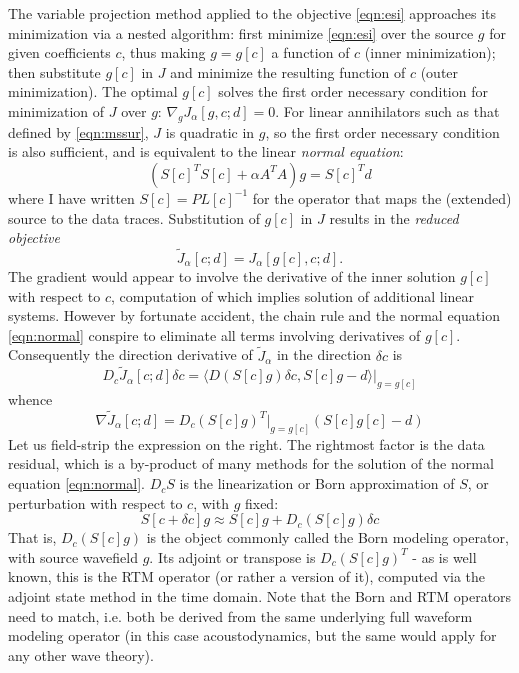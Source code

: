 The variable projection method \cite[]{GolubPereyra:03} applied to the objective \ref{eqn:esi} approaches its minimization via a nested algorithm: first minimize \ref{eqn:esi} over the source $g$ for given coefficients $c$, thus making $g = g[c]$ a function of $c$ (inner minimization); then substitute $g[c]$ in $J$ and minimize the resulting function of $c$ (outer minimization). The optimal $g[c]$ solves the first order necessary condition for minimization of $J$ over $g$: $\nabla_g J_{\alpha}[g,c;d] = 0$. For linear annihilators such as that defined by \ref{eqn:mssur}, $J$ is quadratic in $g$, so the first order necessary condition is also sufficient, and is equivalent to the linear {\em normal equation}:
\begin{equation}
\label{eqn:normal}
(S[c]^TS[c] + \alpha A^TA) g = S[c]^T d
\end{equation}
where I have written $S[c]=PL[c]^{-1}$ for the operator that maps the (extended) source to the data traces. Substitution of $g[c]$ in $J$ results in the {\em reduced objective}
\begin{equation}
\label{eqn:jred}
\tilde{J}_{\alpha}[c;d] = J_{\alpha}[g[c],c;d].
\end{equation}
The gradient would appear to involve the derivative of the inner solution $g[c]$ with respect to $c$, computation of which implies solution of additional linear systems. However by fortunate accident, the chain rule and the normal equation \ref{eqn:normal}
conspire to eliminate all terms involving derivatives of $g[c]$. Consequently the direction derivative of $\tilde{J}_{\alpha}$ in the direction $\delta c$ is
\begin{equation}
\label{eqn:tildejderiv}
D_c\tilde{J}_{\alpha}[c;d]\delta c = \langle D(S[c]g)\delta c,S[c]g-d \rangle|_{g=g[c]}
\end{equation}
whence
\begin{equation}
\label{eqn:l2grad}
\nabla \tilde{J}_{\alpha}[c;d] = D_c(S[c]g)^T|_{g=g[c]}(S[c]g[c]-d)
\end{equation}
Let us field-strip the expression on the right. The rightmost factor is the data residual, which is a by-product of many methods for the solution of the normal equation \ref{eqn:normal}. $D_cS$ is the linearization or Born approximation of $S$, or perturbation with respect to $c$, with $g$ fixed:
\[
S[c+\delta c]g \approx S[c]g + D_c(S[c]g)\delta c
\]
That is, $D_c(S[c]g)$ is the object commonly called the Born modeling operator, with source wavefield $g$. Its adjoint or transpose is $D_c(S[c]g)^T$ - as is well known, this is the RTM operator (or rather a version of it), computed via the adjoint state method in the time domain. Note that the Born and RTM operators need to match, i.e. both be derived from the same underlying full waveform modeling operator (in this case acoustodynamics, but the same would apply for any other wave theory).

